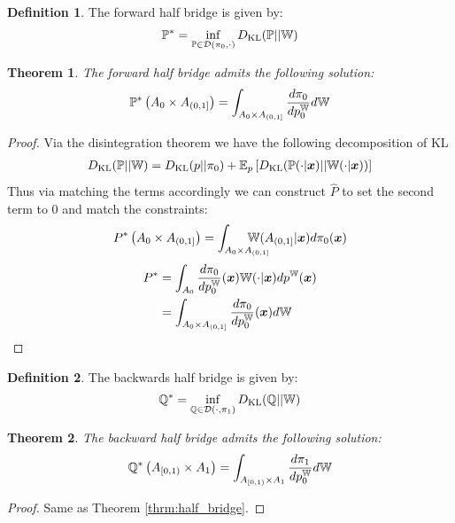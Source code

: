 \documentclass[a4paper,12pt,twoside,openright]{report}
\newtheorem{theorem}{Theorem}
\theoremstyle{definition}
\newtheorem{definition}{Definition}[section]
\begin{document}
\begin{definition}
The forward half bridge is given by:
    \begin{align}
        {{\mathbb{P}}}^{*} = \inf_{{\mathbb{P}}  \in {\mathcal{D}}(\pi_0, \cdot)} D_{\mathrm{KL}} ({\mathbb{P}} || \mathbb{W}) 
    \end{align}
\end{definition}
\begin{theorem}\label{thrm:half_bridge_forward}
    The forward half bridge admits the following solution: 
\begin{align}
    {{\mathbb{P}}}^{*}\left(A_0 \times A_{(0,1]}\right) =  \int_{A_0\times A_{(0,1]}} \frac{d \pi_0}{ dp_0^{\mathbb{W}}} d\mathbb{W}
\end{align}
\end{theorem}
\begin{proof}
Via the disintegration theorem we have the following decomposition of KL
\begin{align}
    D_{\mathrm{KL}}({\mathbb{P}} || \mathbb{W}) = D_{\mathrm{KL}}(p|| \pi_0 )  + \mathbb{E}_p\left[D_{\mathrm{KL}}({\mathbb{P}}(\cdot| {\bm{x}}) || \mathbb{W}(\cdot | {\bm{x}}))\right] \nonumber
\end{align}
Thus via matching the terms accordingly we can construct $\hat{P}$ to set the second term to $0$ and match the constraints:
\begin{align}
    {P}^{*}\left(A_0 \times A_{(0,1]}\right) = \int_{A_0 \times A_{(0,1]}}\!\!\!\!\!\!\!\!\!\!\!\!\W(A_{(0,1]} | \vx) d\pi_0(\vx)
\end{align}
\begin{align}
    {P}^{*} &= \int_{A_0}  \frac{d\pi_0}{dp_0^{\mathbb{W}}}({\bm{x}})   \mathbb{W}(\cdot | {\bm{x}}) d p^{\mathbb{W}}({\bm{x}}) \nonumber \\
    &= \int_{A_0 \times A_{(0,1]} }  \frac{d\pi_0}{dp_0^{\mathbb{W}}}({\bm{x}})  d \mathbb{W}
\end{align}
\end{proof}
\begin{definition}
The backwards half bridge is given by:
    \begin{align}
        {{\mathbb{Q}}}^{*} = \inf_{{\mathbb{Q}}  \in {\mathcal{D}}(\cdot, \pi_1)} D_{\mathrm{KL}} ({\mathbb{Q}} || \mathbb{W}) 
    \end{align}
\end{definition}
\begin{theorem}\label{thrm:half_bridge_backward}
     The backward half bridge admits the following solution: 
\begin{align}
    {{\mathbb{Q}}}^{*}\left( A_{[0,1)} \times A_1\right) =  \int_{ A_{[0,1)} \times A_1}  \frac{d \pi_1}{ d p_0^{\mathbb{W}}} d\mathbb{W}
\end{align}

\end{theorem}
\begin{proof}
Same as Theorem \ref{thrm:half_bridge}.
\end{proof}
\end{document}
